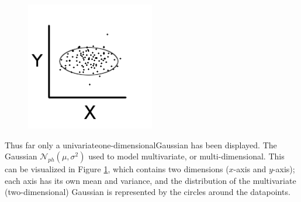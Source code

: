 \DIFaddbegin \begin{figure}
\includegraphics[width=0.5\textwidth]{figure/two-dim-gauss.png}
\caption{\textbf{} \textbf{}\textbf{} \textbf{} }\label{fig:two-dim-gauss}
\end{figure}
\DIFaddend Thus far only a univariate\DIFdelbegin {}\DIFdelend \DIFaddbegin {}\DIFaddend one-dimensional\DIFaddbegin \DIFadd{, }\DIFaddend Gaussian has been displayed.  The Gaussian \DIFdelbegin {}\DIFdelend \DIFaddbegin {}\DIFaddend $\mathcal{N}_{ph}(\mu,\sigma^2)$ used to model \DIFdelbegin {}\DIFdelend \DIFaddbegin {}\DIFaddend multivariate, or multi-dimensional.  This can be visualized in Figure \ref{fig:two-dim-gauss}, which contains two dimensions ($x$-axis and $y$-axis); each axis has its own mean and variance, and the distribution of the multivariate (two-dimensional) Gaussian is represented by the circles around the datapoints.  \DIFdelbegin %
{%
\textbf{} %
\textbf{}%
\textbf{} %
\textbf{} %
}%
